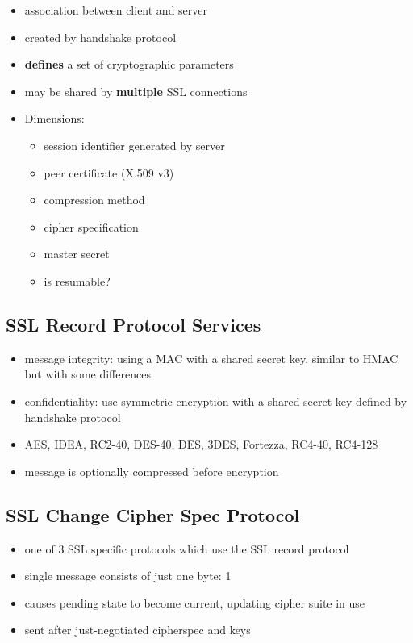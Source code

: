 \documentclass{article}
\begin{document}
\begin{itemize}
    \item association between client and server
    \item created by handshake protocol
    \item \textbf{defines} a set of cryptographic parameters
    \item may be shared by \textbf{multiple} SSL connections
    \item Dimensions:
    \begin{itemize}
        \item session identifier generated by server
        \item peer certificate (X.509 v3)
        \item compression method
        \item cipher specification
        \item master secret
        \item is resumable?
    \end{itemize}
\end{itemize}
\subsection{SSL Record Protocol Services}
\begin{itemize}
    \item message integrity: using a MAC with a shared secret key, similar to HMAC but with some differences
    \item confidentiality: use symmetric encryption with a shared secret key defined by handshake protocol
    \item AES, IDEA, RC2-40, DES-40, DES, 3DES, Fortezza, RC4-40, RC4-128
    \item message is optionally compressed before encryption
\end{itemize}
\subsection{SSL Change Cipher Spec Protocol}
\begin{itemize}
    \item one of 3 SSL specific protocols which use the SSL record protocol
    \item single message consists of just one byte: 1
    \item causes pending state to become current, updating cipher suite in use
    \item sent after just-negotiated cipherspec and keys
\end{itemize}
\end{document}
